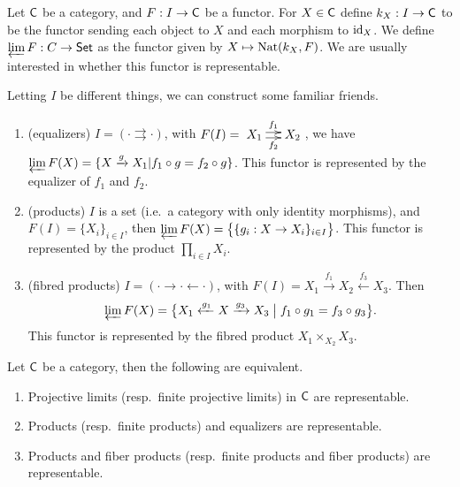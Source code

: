 
 Let $\text{\sf C}$ be a category, and $F:I\to \text{\sf C}$ be a functor. For $X\in \text{\sf C}$ define $k_X:I\to \text{\sf C}$
 to be the functor sending each object to $X$ and each morphism to $\operatorname{id}_X$. We define
 $\varprojlim F:C\to \text{\sf Set}$ as the functor given by $X\mapsto \operatorname{Nat}(k_X,F)$. We are usually
 interested in whether this functor is representable.
 \begin{example}
   Letting $I$ be different things, we can construct some familiar friends.
   \begin{enumerate}
     \item (equalizers) $I= (\cdot \rightrightarrows \cdot)$, with $F(I) =
     \xymatrix@-1pc{X_1 \ar@<.5ex>[r]^{f_1}  \ar@<-.5ex>[r]_{f_2} & X_2 }$, we have
     $\varprojlim F(X) = \{X\xrightarrow{g} X_1|f_1\circ g=f_2\circ g\}$. This functor is
     represented by the equalizer of $f_1$ and $f_2$.
     \item (products) $I$ is a set (i.e.~a category with only identity morphisms), and
     $F(I)=\{X_i\}_{i\in I}$, then $\varprojlim F(X) = \bigl\{\{g_i:X\to X_i\}_{i\in
     I}\bigr\}$. This functor is represented by the product $\prod_{i\in I} X_i$.
     \item (fibred products) $I=(\cdot\rightarrow \cdot \leftarrow \cdot)$, with $F(I) =
     X_1\xrightarrow{f_1} X_2\xleftarrow{f_3} X_3$. Then
     \[
     \varprojlim F(X) = \bigl\{ X_1\xleftarrow{g_1}X\xrightarrow{g_3} X_3\bigm| f_1\circ g_1=f_3\circ g_3\bigr\}.
     \]
     This functor is represented by the fibred product $X_1\times_{X_2}
     X_3$.\qedhere
   \end{enumerate}
 \end{example}
 \begin{lemma}\label{lec03L:limits_representable}
   Let $\text{\sf C}$ be a category, then the following are equivalent.
   \begin{enumerate}
     \item Projective limits (resp.~finite projective limits) in $\text{\sf C}$ are representable.
     \item Products (resp.~finite products) and equalizers are representable.
     \item Products and fiber products (resp.~finite products and fiber products) are representable.
   \end{enumerate}
 \end{lemma}
